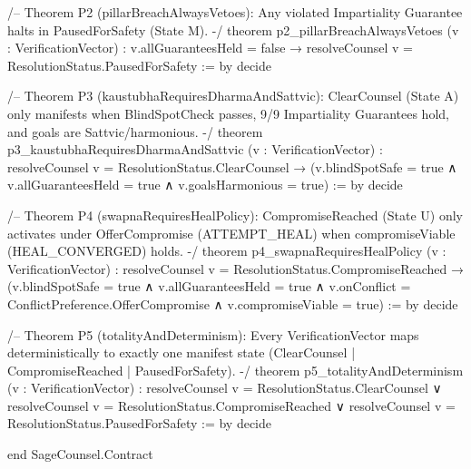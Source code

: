 \documentclass[11pt,a4paper]{article}
\begin{document}
\begin{code}
/-- Theorem P2 (pillarBreachAlwaysVetoes): Any violated Impartiality Guarantee halts in PausedForSafety (State M). -/
theorem p2_pillarBreachAlwaysVetoes (v : VerificationVector) :
    v.allGuaranteesHeld = false → resolveCounsel v = ResolutionStatus.PausedForSafety := by
  decide

/-- Theorem P3 (kaustubhaRequiresDharmaAndSattvic): ClearCounsel (State A) only manifests when
    BlindSpotCheck passes, 9/9 Impartiality Guarantees hold, and goals are Sattvic/harmonious. -/
theorem p3_kaustubhaRequiresDharmaAndSattvic (v : VerificationVector) :
    resolveCounsel v = ResolutionStatus.ClearCounsel →
    (v.blindSpotSafe = true ∧ v.allGuaranteesHeld = true ∧ v.goalsHarmonious = true) := by
  decide

/-- Theorem P4 (swapnaRequiresHealPolicy): CompromiseReached (State U) only activates under
    OfferCompromise (ATTEMPT_HEAL) when compromiseViable (HEAL_CONVERGED) holds. -/
theorem p4_swapnaRequiresHealPolicy (v : VerificationVector) :
    resolveCounsel v = ResolutionStatus.CompromiseReached →
    (v.blindSpotSafe = true ∧ v.allGuaranteesHeld = true ∧
     v.onConflict = ConflictPreference.OfferCompromise ∧ v.compromiseViable = true) := by
  decide

/-- Theorem P5 (totalityAndDeterminism): Every VerificationVector maps deterministically to
    exactly one manifest state (ClearCounsel | CompromiseReached | PausedForSafety). -/
theorem p5_totalityAndDeterminism (v : VerificationVector) :
    resolveCounsel v = ResolutionStatus.ClearCounsel ∨
    resolveCounsel v = ResolutionStatus.CompromiseReached ∨
    resolveCounsel v = ResolutionStatus.PausedForSafety := by
  decide

end SageCounsel.Contract
\end{code}
\end{document}
